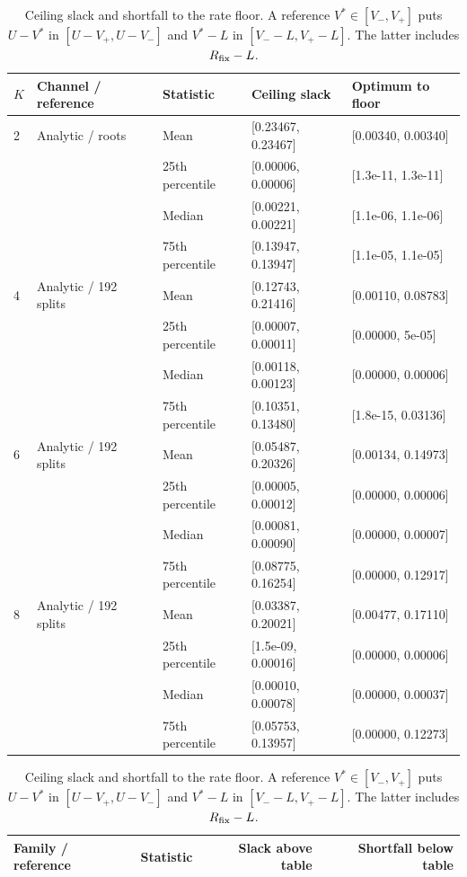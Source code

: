 \begin{table}[htbp]\centering\small
\setlength{\tabcolsep}{4pt}
\caption{Ceiling slack and shortfall to the rate floor. A reference $V^*\in[V_-,V_+]$ puts $U-V^*$ in $[U-V_+,U-V_-]$ and $V^*-L$ in $[V_--L,V_+-L]$. The latter includes $R_{\rm fix}-L$.}\label{supp:decomposition}
\begin{tabular}{lllll}\toprule
$K$ & Channel / reference & Statistic & Ceiling slack & Optimum to floor\\
\midrule
2 & Analytic / roots & Mean & [0.23467, 0.23467] & [0.00340, 0.00340]\\
 &  & 25th percentile & [0.00006, 0.00006] & [1.3e-11, 1.3e-11]\\
 &  & Median & [0.00221, 0.00221] & [1.1e-06, 1.1e-06]\\
 &  & 75th percentile & [0.13947, 0.13947] & [1.1e-05, 1.1e-05]\\
4 & Analytic / 192 splits & Mean & [0.12743, 0.21416] & [0.00110, 0.08783]\\
 &  & 25th percentile & [0.00007, 0.00011] & [0.00000, 5e-05]\\
 &  & Median & [0.00118, 0.00123] & [0.00000, 0.00006]\\
 &  & 75th percentile & [0.10351, 0.13480] & [1.8e-15, 0.03136]\\
6 & Analytic / 192 splits & Mean & [0.05487, 0.20326] & [0.00134, 0.14973]\\
 &  & 25th percentile & [0.00005, 0.00012] & [0.00000, 0.00006]\\
 &  & Median & [0.00081, 0.00090] & [0.00000, 0.00007]\\
 &  & 75th percentile & [0.08775, 0.16254] & [0.00000, 0.12917]\\
8 & Analytic / 192 splits & Mean & [0.03387, 0.20021] & [0.00477, 0.17110]\\
 &  & 25th percentile & [1.5e-09, 0.00016] & [0.00000, 0.00006]\\
 &  & Median & [0.00010, 0.00078] & [0.00000, 0.00037]\\
 &  & 75th percentile & [0.05753, 0.13957] & [0.00000, 0.12273]\\
\bottomrule\end{tabular}
\par\medskip\begin{minipage}{\linewidth}\small
\par\smallskip\noindent\begin{tabular}{llrr}\toprule Family / reference & Statistic & Slack above table & Shortfall below table\\\midrule

\end{tabular}
\end{minipage}
\end{table}
